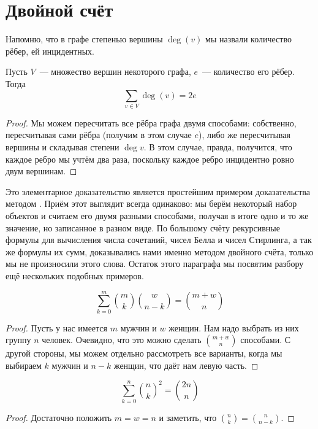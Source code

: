 \section{Двойной счёт}

Напомню, что в графе степенью вершины $\deg(v)$ мы назвали количество рёбер, ей инцидентных.

\begin{thm}
Пусть $V$~--- множество вершин некоторого графа, $e$~--- количество его рёбер. Тогда
$$\sum_{v\in V}\deg(v) = 2e$$
\end{thm}
\begin{proof}
Мы можем пересчитать все рёбра графа двумя способами: собственно, пересчитывая сами рёбра (получим в этом случае $e$), либо же пересчитывая вершины и складывая степени $\deg{v}$. В этом случае, правда, получится, что каждое ребро мы учтём два раза, поскольку каждое ребро инцидентно ровно двум вершинам.
\end{proof}

Это элементарное доказательство является простейшим примером доказательства методом . Приём этот выглядит всегда одинаково: мы берём некоторый набор объектов и считаем его двумя разными способами, получая в итоге одно и то же значение, но записанное в разном виде. По большому счёту рекурсивные формулы для вычисления числа сочетаний, чисел Белла и чисел Стирлинга, а так же формулы их сумм, доказывались нами именно методом двойного счёта, только мы не произносили этого слова. Остаток этого параграфа мы посвятим разбору ещё нескольких подобных примеров.

\begin{thm}
$$\sum_{k=0}^m {m\choose k}{w\choose n-k} = {m+w\choose n}$$
\end{thm}
\begin{proof}
Пусть у нас имеется $m$ мужчин и $w$ женщин. Нам надо выбрать из них группу $n$ человек. Очевидно, что это можно сделать $m+w\choose n$ способами. С другой стороны, мы можем отдельно рассмотреть все варианты, когда мы выбираем $k$ мужчин и $n-k$ женщин, что даёт нам левую часть.
\end{proof}

\begin{corollary}
$$\sum_{k=0}^n{n\choose k}^2 = {2n\choose n}$$
\end{corollary}
\begin{proof}
Достаточно положить $m=w=n$ и заметить, что ${n\choose k}={n\choose n-k}$.
\end{proof}

